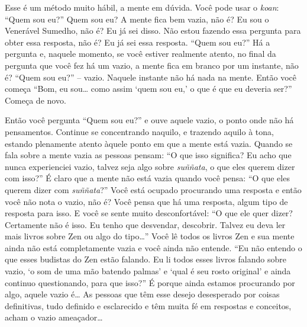 Esse é um método muito hábil, a mente em dúvida. Você pode usar o
\textit{koan}: “Quem sou eu?” Quem sou eu? A mente fica bem vazia, não
é? Eu sou o Venerável Sumedho, não é? Eu já sei disso. Não estou
fazendo essa pergunta para obter essa resposta, não é? Eu já sei essa
resposta. “Quem sou eu?” Há a pergunta e, naquele momento, se você
estiver realmente atento, no final da pergunta que você fez há um
vazio, a mente fica em branco por um instante, não é? “Quem sou eu?” –
vazio. Naquele instante não há nada na mente. Então você começa “Bom,
eu sou… como assim ‘quem sou eu,’ o que é que eu deveria ser?” Começa
de novo.

Então você pergunta “Quem sou eu?” e ouve aquele vazio, o ponto onde
não há pensamentos. Continue se concentrando naquilo, e trazendo aquilo
à tona, estando plenamente atento àquele ponto em que a mente está
vazia. Quando se fala sobre a mente vazia as pessoas pensam: “O que
isso significa? Eu acho que nunca experienciei vazio, talvez seja algo
sobre \textit{suññata}, o que eles querem dizer com isso?” É claro que
a mente não está vazia quando você pensa: “O que eles querem dizer com
\textit{suññata}?” Você está ocupado procurando uma resposta e então
você não nota o vazio, não é? Você pensa que há uma resposta, algum
tipo de resposta para isso. E você se sente muito desconfortável: “O
que ele quer dizer? Certamente não é isso. Eu tenho que desvendar,
descobrir. Talvez eu deva ler mais livros sobre Zen ou algo do tipo…”
Você lê todos os livros Zen e sua mente ainda não está completamente
vazia e você ainda não entende. “Eu não entendo o que esses budistas do
Zen estão falando. Eu li todos esses livros falando sobre vazio, ‘o som
de uma mão batendo palmas’ e ‘qual é seu rosto original’ e ainda
continuo questionando, para que isso?” É porque ainda estamos
procurando por algo, aquele vazio é… As pessoas que têm esse desejo
desesperado por coisas definitivas, tudo definido e esclarecido e têm
muita fé em respostas e conceitos, acham o vazio ameaçador…

